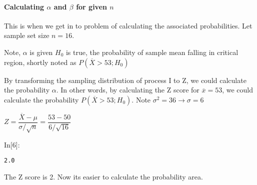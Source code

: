 \documentclass[float=false,crop=false]{standalone}
\begin{document}
    \paragraph{\texorpdfstring{Calculating \(\alpha\) and \(\beta\) for
given
\(n\)}{Calculating \textbackslash{}alpha and \textbackslash{}beta for given n}}\label{calculating-alpha-and-beta-for-given-n}

This is when we get in to problem of calculating the associated
probabilities. Let sample set size \(n=16\).

Note, \(\alpha\) is given \(H_0\) is true, the probability of sample
mean falling in critical region, shortly noted as
\(P(\overline{X} > 53;H_0)\)

By transforming the sampling distribution of process I to Z, we could
calculate the probability \(\alpha\). In other words, by calculating the
Z score for \(\overline{x} = 53\), we could calculate the probability
\(P(\overline{X} > 53; H_0)\). Note \(\sigma^2 = 36 \to \sigma = 6\)

\(Z = \dfrac{\overline{X} - \mu}{\sigma/\sqrt{n}} = \dfrac{53 - 50}{6/\sqrt{16}}\)
\begin{InVerbatim}[commandchars=\\\{\},fontsize=\scriptsize]
{\color{incolor}In[{\color{incolor}6}]:}     
                
               
              
              
        
             
\end{InVerbatim}
    \begin{Verbatim}[commandchars=\\\{\},fontsize=\footnotesize]
2.0

    \end{Verbatim}

    The Z score is 2. Now its easier to calculate the probability area.
\end{document}
